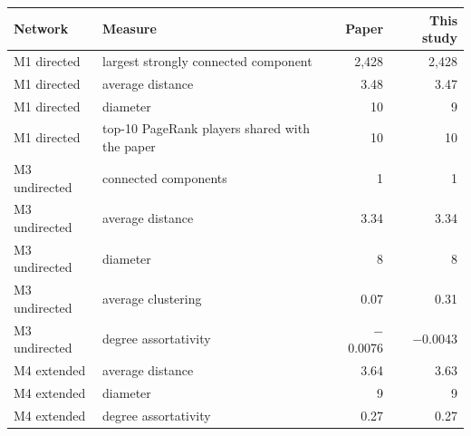 \begin{tabular}{@{}llrr@{}}
\toprule
Network & Measure & Paper & This study \\
\midrule
M1 directed & largest strongly connected component & 2,428 & 2,428 \\
M1 directed & average distance & 3.48 & 3.47 \\
M1 directed & diameter & 10 & 9 \\
M1 directed & top-10 PageRank players shared with the paper & 10 & 10 \\
M3 undirected & connected components & 1 & 1 \\
M3 undirected & average distance & 3.34 & 3.34 \\
M3 undirected & diameter & 8 & 8 \\
M3 undirected & average clustering & 0.07 & 0.31 \\
M3 undirected & degree assortativity & $-$0.0076 & $-$0.0043 \\
M4 extended & average distance & 3.64 & 3.63 \\
M4 extended & diameter & 9 & 9 \\
M4 extended & degree assortativity & 0.27 & 0.27 \\
\bottomrule
\end{tabular}
